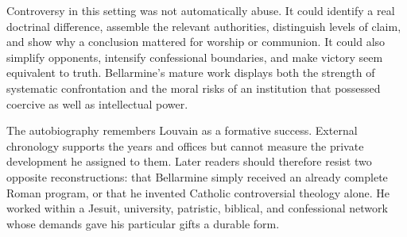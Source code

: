 Controversy in this setting was not automatically abuse.  It could identify a
real doctrinal difference, assemble the relevant authorities, distinguish
levels of claim, and show why a conclusion mattered for worship or communion.
It could also simplify opponents, intensify confessional boundaries, and make
victory seem equivalent to truth.  Bellarmine's mature work displays both the
strength of systematic confrontation and the moral risks of an institution
that possessed coercive as well as intellectual power.

The autobiography remembers Louvain as a formative success.  External
chronology supports the years and offices but cannot measure the private
development he assigned to them.  Later readers should therefore resist two
opposite reconstructions: that Bellarmine simply received an already complete
Roman program, or that he invented Catholic controversial theology alone.  He
worked within a Jesuit, university, patristic, biblical, and confessional
network whose demands gave his particular gifts a durable form.

